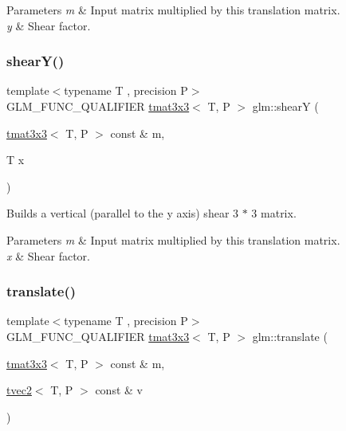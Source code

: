 \begin{DoxyParams}{Parameters}
{\em m} & Input matrix multiplied by this translation matrix. \\
\hline
{\em y} & Shear factor. \\
\hline
\end{DoxyParams}
\mbox{\label{group__gtx__matrix__transform__2d_ga69bfb47d250df7464a5b14f2b95a9b4a}} 
\subsubsection{\texorpdfstring{shear\+Y()}{shearY()}}
{\footnotesize\ttfamily template$<$typename T , precision P$>$ \\
G\+L\+M\+\_\+\+F\+U\+N\+C\+\_\+\+Q\+U\+A\+L\+I\+F\+I\+ER \hyperlink{structglm_1_1tmat3x3}{tmat3x3}$<$ T, P $>$ glm\+::shearY (\begin{DoxyParamCaption}\item[{\hyperlink{structglm_1_1tmat3x3}{tmat3x3}$<$ T, P $>$ const \&}]{m,  }\item[{T}]{x }\end{DoxyParamCaption})}

Builds a vertical (parallel to the y axis) shear 3 $\ast$ 3 matrix.


\begin{DoxyParams}{Parameters}
{\em m} & Input matrix multiplied by this translation matrix. \\
\hline
{\em x} & Shear factor. \\
\hline
\end{DoxyParams}
\mbox{\label{group__gtx__matrix__transform__2d_ga3786656ac137084ef73151636eff44d8}} 
\subsubsection{\texorpdfstring{translate()}{translate()}}
{\footnotesize\ttfamily template$<$typename T , precision P$>$ \\
G\+L\+M\+\_\+\+F\+U\+N\+C\+\_\+\+Q\+U\+A\+L\+I\+F\+I\+ER \hyperlink{structglm_1_1tmat3x3}{tmat3x3}$<$ T, P $>$ glm\+::translate (\begin{DoxyParamCaption}\item[{\hyperlink{structglm_1_1tmat3x3}{tmat3x3}$<$ T, P $>$ const \&}]{m,  }\item[{\hyperlink{structglm_1_1tvec2}{tvec2}$<$ T, P $>$ const \&}]{v }\end{DoxyParamCaption})}

